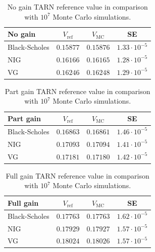 \begin{table}[!ht]
\centering
  \begin{tabular}{l||c|c|c}
    \toprule
    No gain & $V_\text{ref}$ & $V_\text{MC}$ & SE \\
    \toprule
   Black-Scholes & $0.15877$ & $0.15876$ & $1.33\cdot10^{-5}$\\
   NIG 			 & $0.16166$ & $0.16165$ & $1.28\cdot10^{-5}$\\
   VG 			 & $0.16246$ & $0.16248$ & $1.29\cdot10^{-5}$\\
    \bottomrule
  \end{tabular}
  \vspace{5pt}
  \caption{\label{tab:ref_ng} No gain TARN reference value in comparison with $10^7$ Monte Carlo simulations.}
\end{table}

\begin{table}[!ht]
\centering
  \begin{tabular}{l||c|c|c}
    \toprule
    Part gain & $V_\text{ref}$ & $V_\text{MC}$ & SE \\
    \toprule
   Black-Scholes 	& $0.16863$ & $0.16861$ & $1.46\cdot10^{-5}$\\
   NIG 				& $0.17093$ & $0.17094$ & $1.41\cdot10^{-5}$\\
   VG 				& $0.17181$ & $0.17180$ & $1.42\cdot10^{-5}$\\
    \bottomrule
  \end{tabular}
  \vspace{5pt}
  \caption{\label{tab:ref_pg} Part gain TARN reference value in comparison with $10^7$ Monte Carlo simulations.}
\end{table}

\begin{table}[!ht]
\centering
  \begin{tabular}{l||c|c|c}
    \toprule
    Full gain & $V_\text{ref}$ & $V_\text{MC}$ & SE \\
    \toprule
   Black-Scholes 	& $0.17763$ & $0.17763$ & $1.62\cdot10^{-5}$\\
   NIG 				& $0.17929$ & $0.17927$ & $1.57\cdot10^{-5}$\\
   VG 				& $0.18024$ & $0.18026$ & $1.57\cdot10^{-5}$\\
    \bottomrule
  \end{tabular}
  \vspace{5pt}
  \caption{\label{tab:ref_fg} Full gain TARN reference value in comparison with $10^7$ Monte Carlo simulations.}
\end{table}

